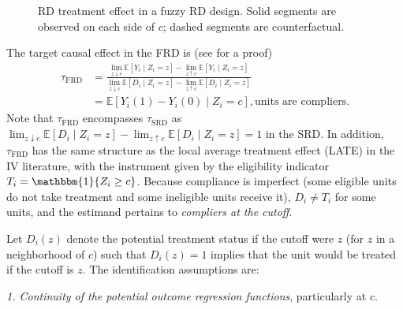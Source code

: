 \begin{figure}[ht]
	\caption{RD treatment effect in a fuzzy RD design. Solid segments are observed on each side of $c$; dashed segments are counterfactual.}
	\label{fig:FRD-muplus-muminus}
\end{figure}

The target causal effect in the FRD is (see \cite{hahn2001rdd} for a proof)
\begin{align*}
\tau_{\text{FRD}}
&=
\frac{\lim_{z \downarrow c}\mathbb{E}[Y_i\mid Z_i=z]-\lim_{z \uparrow c}\mathbb{E}[Y_i\mid Z_i=z]}
{\lim_{z \downarrow c}\mathbb{E}[D_i\mid Z_i=z]-\lim_{z \uparrow c}\mathbb{E}[D_i\mid Z_i=z]}\\
&=\mathbb{E}[Y_i(1)-Y_i(0)\mid Z_i=c], \text{units are compliers}.
\end{align*}
Note that $\tau_{\text{FRD}}$ encompasses $\tau_{\text{SRD}}$ as $\lim_{z \downarrow c}\mathbb{E}[D_i\mid Z_i=z]-\lim_{z \uparrow c}\mathbb{E}[D_i\mid Z_i=z]=1$ in the SRD. In addition, $\tau_{\text{FRD}}$ has the same structure as the local average treatment effect (LATE) in the IV literature, with the instrument given by the eligibility indicator \(T_i=\mathbbm{1}\{Z_i\ge c\}\). Because compliance is imperfect (some eligible units do not take treatment and some ineligible units receive it), \(D_i \neq T_i\) for some units, and the estimand pertains to \emph{compliers at the cutoff}.

Let \(D_i(z)\) denote the potential treatment status if the cutoff were \(z\) (for \(z\) in a neighborhood of \(c\)) such that $D_i(z)=1$ implies that the unit would be treated if the cutoff is $z$. The identification assumptions are: 

\textit{1. Continuity of the potential outcome regression functions}, particularly at \(c\).

